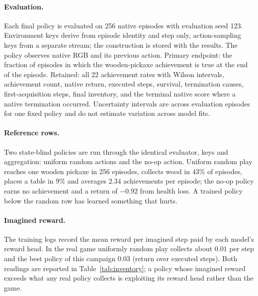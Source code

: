 \paragraph{Evaluation.}
Each final policy is evaluated on 256 native episodes with evaluation seed 123. Environment keys
derive from episode identity and step only, action-sampling keys from a separate stream; the
construction is stored with the results. The policy observes native RGB and its previous action.
Primary endpoint: the fraction of episodes in which the wooden-pickaxe achievement is true at the
end of the episode. Retained: all 22 achievement rates with Wilson intervals, achievement count,
native return, executed steps, survival, termination causes, first-acquisition steps, final
inventory, and the terminal native score where a native termination occurred. Uncertainty
intervals are across evaluation episodes for one fixed policy and do not estimate variation
across model fits.

\paragraph{Reference rows.}
Two state-blind policies are run through the identical evaluator, keys and aggregation: uniform
random actions and the no-op action. Uniform random play reaches one wooden pickaxe in 256
episodes, collects wood in $43\%$ of episodes, places a table in $9\%$ and averages $2.34$
achievements per episode; the no-op policy earns no achievement and a return of $-0.92$ from
health loss. A trained policy below the random row has learned something that hurts.

\paragraph{Imagined reward.}
The training logs record the mean reward per imagined step paid by each model's reward head. In
the real game uniformly random play collects about $0.01$ per step and the best policy of this
campaign $0.03$ (return over executed steps). Both readings are reported in
Table~\ref{tab:inventory}; a policy whose imagined reward exceeds what any real policy collects is
exploiting its reward head rather than the game.
